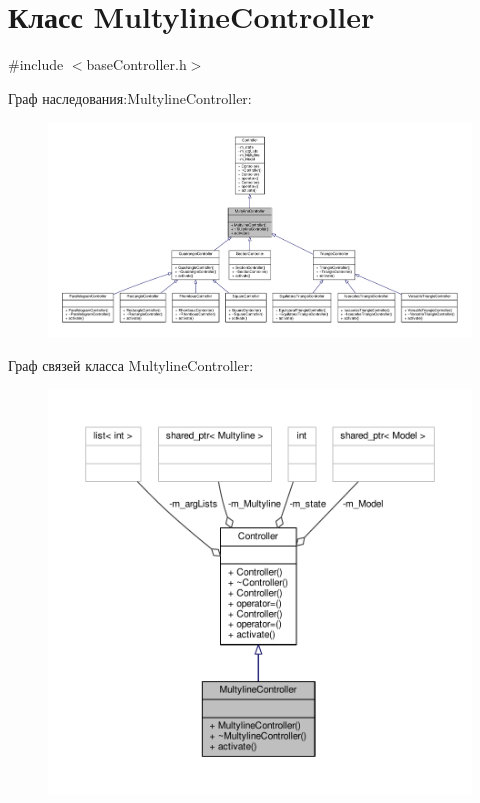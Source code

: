 \hypertarget{class_multyline_controller}{\section{Класс Multyline\-Controller}
\label{class_multyline_controller}
}


{\ttfamily \#include $<$base\-Controller.\-h$>$}



Граф наследования\-:Multyline\-Controller\-:
\nopagebreak
\begin{figure}[H]
\begin{center}
\leavevmode
\includegraphics[width=350pt]{class_multyline_controller__inherit__graph}
\end{center}
\end{figure}


Граф связей класса Multyline\-Controller\-:
\nopagebreak
\begin{figure}[H]
\begin{center}
\leavevmode
\includegraphics[width=350pt]{class_multyline_controller__coll__graph}
\end{center}
\end{figure}
